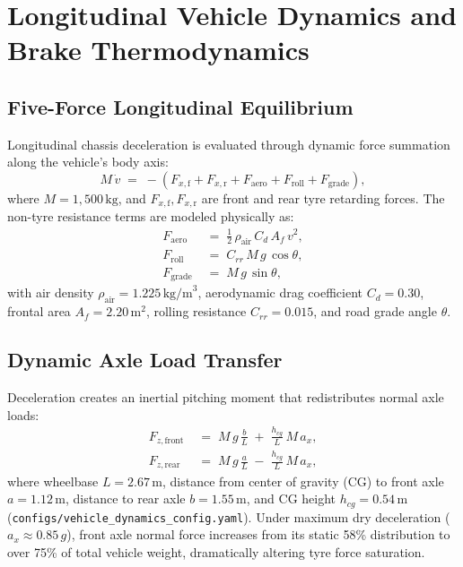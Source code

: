 \documentclass[3p,twocolumn]{elsarticle}
\begin{document}
\section{Longitudinal Vehicle Dynamics and Brake Thermodynamics}
\label{sec:dynamics}

\subsection{Five-Force Longitudinal Equilibrium}
Longitudinal chassis deceleration is evaluated through dynamic force summation along the vehicle's body axis:
\begin{equation}
  M\,\dot{v} \;=\; -\left( F_{x,\text{f}} + F_{x,\text{r}} + F_{\text{aero}} + F_{\text{roll}} + F_{\text{grade}} \right),
  \label{eq:long_forces}
\end{equation}
where $M = 1,500\,\text{kg}$, and $F_{x,\text{f}}, F_{x,\text{r}}$ are front and rear tyre retarding forces. The non-tyre resistance terms are modeled physically as:
\begin{align}
  F_{\text{aero}} &\;=\; \frac{1}{2}\,\rho_{\text{air}}\,C_d\,A_f\,v^2, \label{eq:aero} \\
  F_{\text{roll}} &\;=\; C_{rr}\,M\,g\,\cos\theta, \label{eq:roll} \\
  F_{\text{grade}} &\;=\; M\,g\,\sin\theta, \label{eq:grade}
\end{align}
with air density $\rho_{\text{air}} = 1.225\,\text{kg/m}^3$, aerodynamic drag coefficient $C_d = 0.30$, frontal area $A_f = 2.20\,\text{m}^2$, rolling resistance $C_{rr} = 0.015$, and road grade angle $\theta$.

\subsection{Dynamic Axle Load Transfer}
Deceleration creates an inertial pitching moment that redistributes normal axle loads:
\begin{align}
  F_{z,\text{front}} &\;=\; M\,g\,\frac{b}{L} \;+\; \frac{h_{cg}}{L}\,M\,a_x, \label{eq:fz_front} \\
  F_{z,\text{rear}}  &\;=\; M\,g\,\frac{a}{L} \;-\; \frac{h_{cg}}{L}\,M\,a_x, \label{eq:fz_rear}
\end{align}
where wheelbase $L = 2.67$\,m, distance from center of gravity (CG) to front axle $a = 1.12$\,m, distance to rear axle $b = 1.55$\,m, and CG height $h_{cg} = 0.54$\,m (\texttt{configs/vehicle\_dynamics\_config.yaml}). Under maximum dry deceleration ($a_x \approx 0.85\,g$), front axle normal force increases from its static 58\% distribution to over 75\% of total vehicle weight, dramatically altering tyre force saturation.
\end{document}

